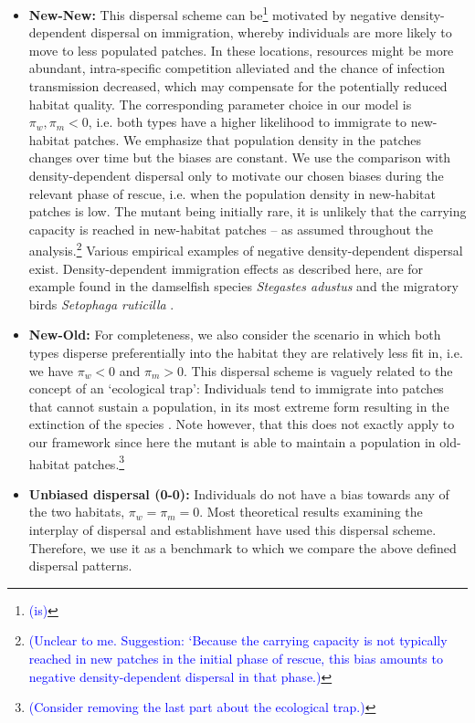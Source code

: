 \documentclass[a4paper,11pt]{article}
\newcommand{\francois}[1]{\textcolor{blue}{(#1)}}
\newcommand{\chg}[1]{\textcolor{change}{#1}}
\begin{document}
\begin{itemize}
	\item \textbf{New-New:} \chg{This dispersal scheme can be\footnote{\francois{is}} motivated by negative density-dependent dispersal on immigration,} whereby individuals are more likely to move to less populated patches. In these locations, resources might be more abundant, intra-specific competition alleviated and the chance of infection transmission decreased, which may compensate for the potentially reduced habitat quality. The corresponding parameter choice in our model is $\pi_w,\pi_m<0$, i.e. both types have a higher likelihood to immigrate to new-habitat patches. \chg{We emphasize that population density in the patches changes over time but the biases are constant. We use the comparison with density-dependent dispersal only to motivate our chosen biases during the relevant phase of rescue, i.e. when the population density in new-habitat patches is low.}
	The mutant being initially rare, it is unlikely that the carrying capacity is reached in new-habitat patches -- as assumed throughout the analysis.\footnote{\francois{Unclear to me. Suggestion: `Because the carrying capacity is not typically reached in new patches in the initial phase of rescue, this bias amounts to negative density-dependent dispersal in that phase.}} 
	Various empirical examples of negative density-dependent dispersal exist. Density-dependent immigration effects as described here, are for example found in the damselfish species \textit{Stegastes adustus} \citep{turgeon_2012} and the migratory birds \textit{Setophaga ruticilla} \citep{wilson_2017}. %
	
	\item \textbf{New-Old:} For completeness, we also consider the scenario in which both types disperse preferentially into the habitat they are relatively less fit in, i.e. we have $\pi_w<0$ and $\pi_m>0$. This dispersal scheme is \chg{vaguely} related to the concept of an `ecological trap': Individuals tend to immigrate into patches that cannot sustain a population, in its most extreme form resulting in the extinction of the species \citep{battin_2004}. \chg{Note however,} that this does not exactly apply to our framework since here the mutant is able to maintain a population in old-habitat patches.\footnote{\francois{Consider removing the last part about the ecological trap.}} 
	
	\item \textbf{Unbiased dispersal (0-0):} Individuals do not have a bias towards any of the two habitats, $\pi_w=\pi_m=0$. Most theoretical results examining the interplay of dispersal and establishment have \chg{used} this dispersal scheme. Therefore, we use it as a benchmark to which we compare the above defined dispersal patterns.
\end{itemize}
\end{document}
